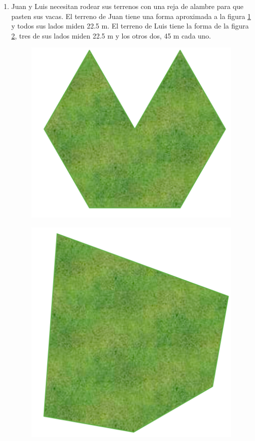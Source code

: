 \documentclass[11pt]{book}
\begin{document}
\begin{enumerate}
  \item Juan y Luis necesitan rodear sus terrenos con una reja de alambre para que pasten
        sus vacas. El terreno de Juan tiene una forma aproximada a la figura \ref{fig:polygon1} y todos sus
        lados miden 22.5 m. El terreno de Luis tiene la forma de la figura \ref{fig:polygon2}, tres de sus
        lados miden 22.5 m y los otros dos, 45 m cada uno.

        \begin{minipage}{0.45\textwidth}
          \begin{figure}[H]
            \centering
            \includegraphics[width=.45\linewidth]{polygon1.png}
            \label{fig:polygon1}
          \end{figure}
        \end{minipage}\hfill
        \begin{minipage}{0.45\textwidth}
          \begin{figure}[H]
            \centering
            \includegraphics[width=.45\linewidth]{polygon2.png}
            \label{fig:polygon2}
          \end{figure}
        \end{minipage}


\end{enumerate}
\end{document}
